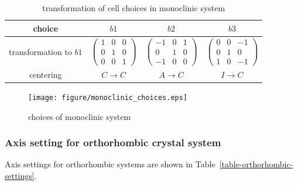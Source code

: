 \begin{table}[htb]
  \centering
  \caption{transformation of cell choices in monoclinic system}
  \label{table-monoclinic-cellchoice}
  \begin{tabular}{c|ccc}
    \hline\hline
    choice                 & $b1$                                                & $b2$                                                  & $b3$                                                  \\
    \hline
    transformation to $b1$ & $\begin{pmatrix} 1&0&0\\0&1&0\\0&0&1 \end{pmatrix}$ & $\begin{pmatrix} -1&0&1\\0&1&0\\-1&0&0 \end{pmatrix}$ & $\begin{pmatrix} 0&0&-1\\0&1&0\\1&0&-1 \end{pmatrix}$ \\
    \hline
    centering              & $C \to C$                                           & $A \to C$                                             & $I \to C$                                             \\
    \hline\hline
  \end{tabular}
\end{table}

\begin{figure}[htb]
  \centering
  \texttt{[image: figure/monoclinic\_choices.eps]}
  \caption{choices of monoclinic system}
  \label{fig:monoclinic-choices}
\end{figure}

\subsubsection{Axis setting for orthorhombic crystal system}

Axis settings for orthorhombic systems are shown in Table~\ref{table-orthorhombic-settings}.

